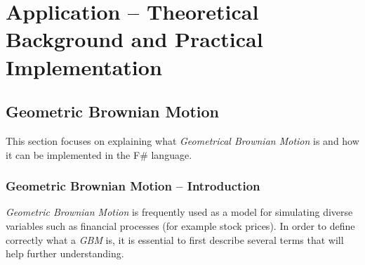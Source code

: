 \chapter{Application -- Theoretical Background and Practical Implementation}

\section{Geometric Brownian Motion}
    This section focuses on explaining what \textit{Geometrical Brownian Motion} is and how it can be implemented in the F\# language.
    
    \subsection{Geometric Brownian Motion -- Introduction}
        \textit{Geometric Brownian Motion} is frequently used as a model for simulating diverse variables such as financial processes (for example stock prices). In order to define correctly what a \textit{GBM} is, it is essential to first describe several terms that will help further understanding.
    
